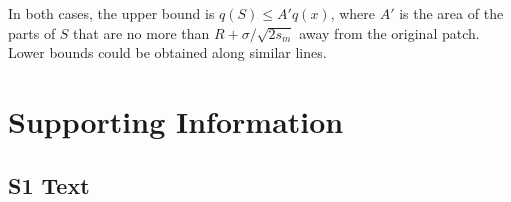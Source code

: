 \documentclass[10pt,letterpaper]{article}
\begin{document}
In both cases,
the upper bound is $q(S) \le A' q(x)$,
where $A'$ is the area of the parts of $S$ that are no more than $R+\sigma/\sqrt{2s_m}$ away from the original patch.
Lower bounds could be obtained along similar lines.




% 
% 
% 
% 
% 

\section*{Supporting Information}

\subsection*{S1 Text}
\label{apx:elliptic_integrals}
\end{document}

